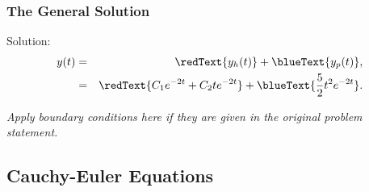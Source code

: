 \begin{frame}
  \frametitle{The General Solution}
  Solution:
  \begin{eqnarray*}
    y(t) & = & \redText{y_h(t)} + \blueText{y_p(t)}, \\
         & = & \redText{C_1 e^{-2t} + C_2 t e^{-2 t}} + \blueText{\frac{5}{2} t^2 e^{-2t}}.
  \end{eqnarray*}

  \textit{Apply boundary conditions here if they are given in the original problem statement.}

\end{frame}


\subsection{Cauchy-Euler Equations}

